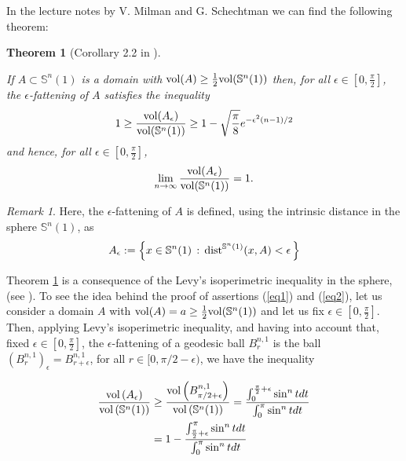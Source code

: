 \documentclass{amsart}
\newtheorem{theoremA}{Theorem}
\theoremstyle{definition}
\theoremstyle{remark}
\newtheorem{remark}[theorem]{Remark}
\newcommand{\ese}{\mathbb{S}}
\begin{document}
In the lecture notes by V. Milman and G. Schechtman \cite{MS} we can find the following theorem:

\begin{theoremA}[Corollary 2.2 in \cite{MS}]\label{measurecon}\

 If $A\subset \mathbb{S}^n(1)$ is a domain with ${\rm vol }(A)\geq \frac{1}{2} {\rm vol}(\mathbb{S}^n(1))$ then, for all $\epsilon \in [0,\frac{\pi}{2}]$, the  $\epsilon$-fattening of $A$ satisfies the inequality
\begin{equation}\label{eq1}
1 \geq \frac{{\rm vol}(A_\epsilon)}{{\rm vol}(\mathbb{S}^n(1))}\geq 1-\sqrt{\frac{\pi}{8}}e^{-\epsilon^2(n-1)/2}
\end{equation}
\noindent and hence, for all $\epsilon \in [0,\frac{\pi}{2}]$, 
\begin{equation}\label{eq2}
\lim_{n\to \infty} \frac{{\rm vol}(A_\epsilon)}{{\rm vol}(\mathbb{S}^n(1))}= 1.
\end{equation}
\end{theoremA}  
\begin{remark}
Here, the $\epsilon$-fattening of $A$ is defined, using the intrinsic distance in the sphere $\ese^n(1)$, as
$$A_\epsilon:=\left\{x\in \mathbb{S}^n(1)\, :\, {\rm dist}^{\mathbb{S}^n(1)}(x,A)<\epsilon\, \right\}
$$
 \end{remark}

 Theorem \ref{measurecon} is a consequence of the Levy's isoperimetric inequality in the sphere, (see \cite{MS}).
  To see the idea behind the proof of assertions (\ref{eq1}) and (\ref{eq2}), let us consider a  domain $A$ with ${\rm vol }(A)=a \geq \frac{1}{2} {\rm vol}(\mathbb{S}^n(1))$ and let us fix $\epsilon \in [0,\frac{\pi}{2}]$. Then,  applying Levy's isoperimetric inequality, and having into account that, fixed $\epsilon \in [0,\frac{\pi}{2}]$, the $\epsilon$-fattening of a geodesic ball $B^{n,1}_{r}$ is the ball $(B^{n,1}_{r})_{\epsilon}=B^{n,1}_{r+\epsilon}$, for all $r \in [0,\pi/2-\epsilon)$, we have the inequality

\begin{equation}
\begin{aligned}
\frac{{\rm vol}\left(A_\epsilon\right)}{{\rm vol}\left(\mathbb{S}^n(1)\right)}&\geq  \frac{{\rm vol}\left(B^{n,1}_{\pi/2+\epsilon}\right)}{{\rm vol}\left(\mathbb{S}^n(1)\right)}= \frac{\int _0^{\frac{\pi}{2}+\epsilon} \sin^n t dt }{\int _0^\pi \sin^n t dt }\\
&=1-\frac{\int_{\frac{\pi}{2}+\epsilon}^{\pi} \sin^n t dt }{\int _0^\pi \sin^n t dt }
\end{aligned}
\end{equation}
\end{document}
